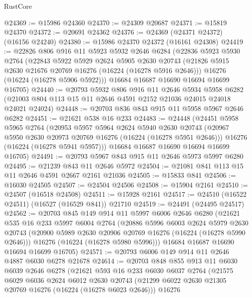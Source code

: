 \begin{lexlean}{RustCore}
\begin{coremodule}
@24369 := @15986 @24360
@24370 := @24309 @20687
@24371 := @15819 @24370
@24372 := @20691 @24362
@24376 := @24369 (@24371 @24372) (@16156 @24240)
@24380 := @15986 @24370 @24372 (@16161 @24308)
@24419 := @22826
    @806
    @916
    @11
    @5923
    @5932
    @2646
    @6284
    (@22836
      @5923
      @5930
      @2764
      (@22843
        @5922
        @5929
        @2624
        @5905
        @2630
        @20743
        (@21826 @5915 @2630 @21676 @20769 @16276 (@16224 (@16278 @5916 @2646)))
        @16276
        (@16224 (@16278 @5906 @5922)))
      @16684
      @16687
      @16690
      @16694
      @16699
      @16705)
@24440 := @20793
    @5932
    @806
    @916
    @11
    @2646
    @5934
    @5958
    @6282
    (@21003 @804 @113 @15 @11 @2646 @4591 @2152 @21036 @24015 @24018 @24021 @24024)
@24448 := @20703 @836 @843 @915 @11 @5958 @5967 @2646 @6282
@24451 := @21621 @538 @16 @233
@24483 := @24448
    (@24451
      @5958
      @5965
      @2764
      (@20953
        @5957
        @5964
        @2624
        @5940
        @2630
        @20743
        (@20967 @5950 @2630 @20973 @20769 @16276 (@16224 (@16278 @5951 @2646)))
        @16276
        (@16224 (@16278 @5941 @5957)))
      @16684
      @16687
      @16690
      @16694
      @16699
      @16705)
@24491 := @20793 @5967 @843 @915 @11 @2646 @5973 @5997 @6280
@24495 := @21239 @843 @11 @2646 @5972
@24504 := @21081 @841 @113 @15 @11 @2646 @4591 @2667 @2161 @21036
@24505 := @15833 @841
@24506 := @16030 @24505
@24507 := @24504 @24506
@24508 := @15904 @2161
@24510 := @24507 (@16518 @24508)
@24511 := @15928 @2161
@24517 := @24510 (@16522 @24511) (@16527 (@16529 @841)) @21710
@24519 := @24491 (@24495 @24517)
@24562 := @20703
    @845
    @149
    @914
    @11
    @5997
    @6006
    @2646
    @6280
    (@21621
      @535
      @16
      @233
      @5997
      @6004
      @2764
      (@20886
        @5996
        @6003
        @2624
        @5979
        @2630
        @20743
        (@20900 @5989 @2630 @20906 @20769 @16276 (@16224 (@16278 @5990 @2646)))
        @16276
        (@16224 (@16278 @5980 @5996)))
      @16684
      @16687
      @16690
      @16694
      @16699
      @16705)
@24571 := @20793 @6006 @149 @914 @11 @2646 @4887 @6030 @6278 @21678
@24614 := @20703
    @848
    @855
    @913
    @11
    @6030
    @6039
    @2646
    @6278
    (@21621
      @593
      @16
      @233
      @6030
      @6037
      @2764
      (@21575
        @6029
        @6036
        @2624
        @6012
        @2630
        @20743
        (@21299 @6022 @2630 @21305 @20769 @16276 (@16224 (@16278 @6023 @2646)))
        @16276

\end{coremodule}
\end{lexlean}
